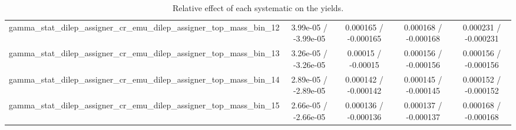 \documentclass[10pt]{article}
\begin{document}
\begin{table}[htbp]
\begin{center}
\begin{tabular}{|c|c|c|c|c|}
  gamma_stat_dilep_assigner_cr_emu_dilep_assigner_top_mass_bin_12 & 3.99e-05 / -3.99e-05 & 0.000165 / -0.000165 & 0.000168 / -0.000168 & 0.000231 / -0.000231 \\ 
  gamma_stat_dilep_assigner_cr_emu_dilep_assigner_top_mass_bin_13 & 3.26e-05 / -3.26e-05 & 0.00015 / -0.00015 & 0.000156 / -0.000156 & 0.000156 / -0.000156 \\ 
  gamma_stat_dilep_assigner_cr_emu_dilep_assigner_top_mass_bin_14 & 2.89e-05 / -2.89e-05 & 0.000142 / -0.000142 & 0.000145 / -0.000145 & 0.000152 / -0.000152 \\ 
  gamma_stat_dilep_assigner_cr_emu_dilep_assigner_top_mass_bin_15 & 2.66e-05 / -2.66e-05 & 0.000136 / -0.000136 & 0.000137 / -0.000137 & 0.000168 / -0.000168 \\ 
\hline 
\end{tabular} 
\caption{Relative effect of each systematic on the yields.} 
\end{center} 
\end{table} 
\end{document}
